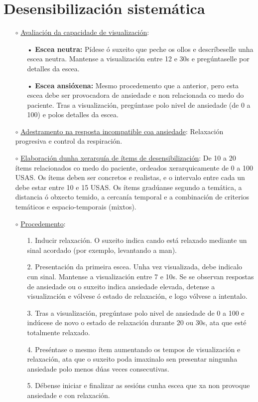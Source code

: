 \documentclass[a4paper,11pt]{article}
\begin{document}
\section{Desensibilización sistemática}
\begin{enumerate}
	\item[$\circ$] \underline{Avaliación da capacidade de visualización}: 
	\begin{itemize}
		\item[•] \textbf{Escea neutra:} Pídese ó suxeito que peche os ollos e descríbeselle unha 
		escea neutra. Mantense a visualización entre 12 e 30s e pregúntaselle por detalles da escea.
		\item[•] \textbf{Escea ansióxena:} Mesmo procedemento que a anterior, pero esta escea debe 
		ser provocadora de ansiedade e non relacionada co medo do paciente. Tras a visualización, 
		pregúntase polo nivel de ansiedade (de 0 a 100) e polos detalles da escea. 
	\end{itemize}
	\item[$\circ$] \underline{Adestramento na resposta incompatible coa ansiedade}: Relaxación 
	progresiva e control da respiración.
	\item[$\circ$] \underline{Elaboración dunha xerarquía de ítems de desensibilización}: De 10 a 20 
	ítems relacionados co medo do paciente, ordeados xerarquicamente de 0 a 100 USAS. Os ítems deben 
	ser concretos e realistas, e o intervalo entre cada un debe estar entre 10 e 15 USAS. Os ítems 
	gradúanse segundo a temática, a distancia ó obxecto temido, a cercanía temporal e a combinación 
	de criterios temáticos e espacio-temporais (mixtos). 
	\item[$\circ$] \underline{Procedemento}:
	\begin{itemize}
		\item[1.] Inducir relaxación. O suxeito indica cando está relaxado mediante un sinal acordado 
		(por exemplo, levantando a man).
		\item[2.] Presentación da primeira escea. Unha vez visualizada, debe indicalo cun sinal. 
		Mantense a visualización entre 7 e 10s. Se se observan respostas de ansiedade ou o suxeito 
		indica ansiedade elevada, detense a visualización e vólvese ó estado de relaxación, e logo 
		vólvese a intentalo.
		\item[3.] Tras a visualización, pregúntase polo nivel de ansiedade de 0 a 100 e indúcese de 
		novo o estado de relaxación durante 20 ou 30s, ata que esté totalmente relaxado.
		\item[4.] Preséntase o mesmo ítem aumentando os tempos de visualización e relaxación, ata que 
		o suxeito poda imaxinalo sen presentar ningunha ansiedade polo menos dúas veces consecutivas. 
		\item[5.] Débense iniciar e finalizar as sesións cunha escea que xa non provoque ansiedade e 
		con relaxación.
	\end{itemize}
\end{enumerate}
\end{document}
